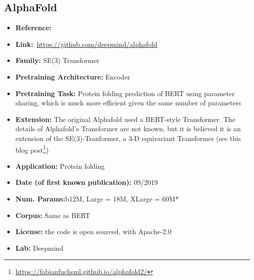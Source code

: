 \documentclass{article}
\begin{document}
\subsection{AlphaFold}
            \begin{itemize}
            \item \textbf{Reference:}~          
            \item \textbf{Link:}~\url{https://github.com/deepmind/alphafold}
            \item \textbf{Family:} SE(3) Transformer~
            \item \textbf{Pretraining Architecture:} Encoder
            \item \textbf{Pretraining Task:} Protein folding prediction of BERT using parameter sharing, which is much more efficient given the same number of parameters
            \item \textbf{Extension:} The original Alphafold used a BERT-style Transformer. The details of Alphafold’s Transformer are not known, but it is believed it is an extension of the SE(3)-Tranformer, a 3-D equivariant Transformer (see this blog post\footnote{\url{https://fabianfuchsml.github.io/alphafold2/}})   
            \item \textbf{Application:} Protein folding
            \item \textbf{Date (of first known publication):} 09/2019
            \item \textbf{Num. Params:}b12M, Large = 18M, XLarge = 60M*
            \item \textbf{Corpus:} Same as BERT
            \item \textbf{License:} the code is open sourced, with Apache-2.0
            \item \textbf{Lab:} Deepmind
            \end{itemize}

\end{document}
